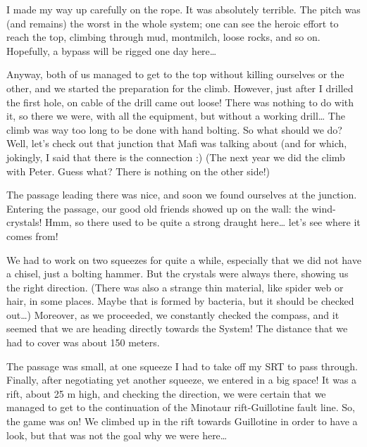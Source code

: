 I made my way up carefully on the rope. It was absolutely terrible. The
pitch was (and remains) the worst in the whole system; one can see the
heroic effort to reach the top, climbing through mud, montmilch, loose
rocks, and so on. Hopefully, a bypass will be rigged one day
here\ldots{}

Anyway, both of us managed to get to the top without killing ourselves
or the other, and we started the preparation for the climb. However,
just after I drilled the first hole, on cable of the drill came out
loose! There was nothing to do with it, so there we were, with all the
equipment, but without a working drill\ldots{} The climb was way too
long to be done with hand bolting. So what should we do? Well, let's
check out that junction that Mafi was talking about (and for which,
jokingly, I said that there is the connection :) (The next year we did
the climb with Peter. Guess what? There is nothing on the other side!)

The passage leading there was nice, and soon we found ourselves at the
junction. Entering the passage, our good old friends showed up on the
wall: the wind-crystals! Hmm, so there used to be quite a strong draught
here\ldots{} let's see where it comes from!

We had to work on two squeezes for quite a while, especially that we did
not have a chisel, just a bolting hammer. But the crystals were always
there, showing us the right direction. (There was also a strange thin
material, like spider web or hair, in some places. Maybe that is formed
by bacteria, but it should be checked out\ldots{}) Moreover, as we
proceeded, we constantly checked the compass, and it seemed that we are
heading directly towards the System! The distance that we had to cover
was about 150 meters.

The passage was small, at one squeeze I had to take off my SRT to pass
through. Finally, after negotiating yet another squeeze, we entered in a
big space! It was a rift, about 25 m high, and checking the direction,
we were certain that we managed to get to the continuation of the
Minotaur rift-Guillotine fault line. So, the game was on! We climbed up
in the rift towards Guillotine in order to have a look, but that was not
the goal why we were here\ldots{}

